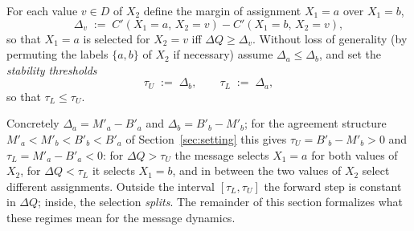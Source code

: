 \begin{definition}\label{def:thresholds}
For each value $v \in D$ of $X_2$ define the margin of assignment $X_1=a$ over $X_1=b$,
\[
    \Delta_v \;:=\; C'(X_1{=}a,\, X_2{=}v) - C'(X_1{=}b,\, X_2{=}v),
\]
so that $X_1=a$ is selected for $X_2=v$ iff $\Delta Q \geq \Delta_v$. Without loss of generality (by permuting the labels $\{a,b\}$ of $X_2$ if necessary) assume $\Delta_a \leq \Delta_b$, and set the \emph{stability thresholds}
\[
    \tau_U \;:=\; \Delta_b, \qquad \tau_L \;:=\; \Delta_a,
\]
so that $\tau_L \leq \tau_U$.
\end{definition}
\noindent Concretely $\Delta_a = M'_a - B'_a$ and $\Delta_b = B'_b - M'_b$; for the agreement structure $M'_a < M'_b < B'_b < B'_a$ of Section~\ref{sec:setting} this gives $\tau_U = B'_b - M'_b > 0$ and $\tau_L = M'_a - B'_a < 0$: for $\Delta Q > \tau_U$ the message selects $X_1=a$ for both values of $X_2$, for $\Delta Q < \tau_L$ it selects $X_1=b$, and in between the two values of $X_2$ select different assignments.  Outside the interval $[\tau_L, \tau_U]$ the forward step is constant in $\Delta Q$; inside, the selection \emph{splits}.  The remainder of this section formalizes what these regimes mean for the message dynamics.
